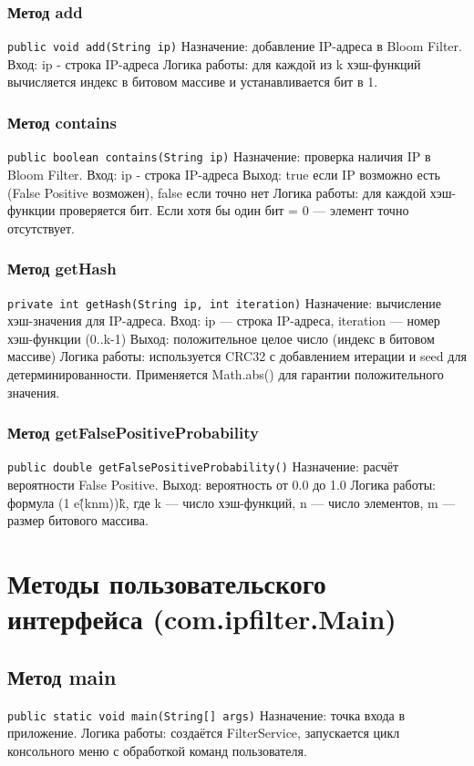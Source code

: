 \subsubsection{Метод add}
\texttt{public void add(String ip)}
Назначение: добавление IP-адреса в Bloom Filter.
Вход: ip - строка IP-адреса
Логика работы: для каждой из k хэш-функций вычисляется индекс в битовом массиве и устанавливается бит в 1.
\subsubsection{Метод contains}
\texttt{public boolean contains(String ip)}
Назначение: проверка наличия IP в Bloom Filter.
Вход: ip - строка IP-адреса
Выход: true если IP возможно есть (False Positive возможен), false если точно нет
Логика работы: для каждой хэш-функции проверяется бит. Если хотя бы один бит = 0 — элемент точно отсутствует.
\subsubsection{Метод getHash}
\texttt{private int getHash(String ip, int iteration)}
Назначение: вычисление хэш-значения для IP-адреса.
Вход: ip — строка IP-адреса, iteration — номер хэш-функции (0..k-1)
Выход: положительное целое число (индекс в битовом массиве)
Логика работы: используется CRC32 с добавлением итерации и seed для детерминированности. Применяется Math.abs() для гарантии положительного значения.
\subsubsection{Метод getFalsePositiveProbability}
\texttt{public double getFalsePositiveProbability()}
Назначение: расчёт вероятности False Positive.
Выход: вероятность от 0.0 до 1.0
Логика работы: формула (1 \- e\^(\-kn\/m))\^k, где k — число хэш-функций, n — число элементов, m — размер битового массива.

\section{Методы пользовательского интерфейса (com.ipfilter.Main)}
\subsection{Метод main}
\texttt{public static void main(String[] args)}
Назначение: точка входа в приложение.
Логика работы: создаётся FilterService, запускается цикл консольного меню с обработкой команд пользователя.


